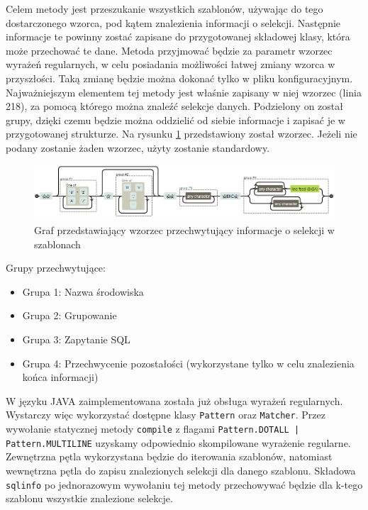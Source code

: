 Celem metody jest przeszukanie wszystkich szablonów, używając do tego dostarczonego wzorca, pod kątem znalezienia informacji o selekcji. Następnie informacje te powinny zostać zapisane do przygotowanej składowej klasy, która może przechować te dane. 
Metoda przyjmować będzie za parametr wzorzec wyrażeń regularnych, w celu posiadania możliwości łatwej zmiany wzorca w przyszłości. Taką zmianę będzie można dokonać tylko w pliku konfiguracyjnym. 
Najważniejszym elementem tej metody jest właśnie zapisany w niej wzorzec (linia 218), za pomocą którego można znaleźć selekcje danych. Podzielony on został grupy, dzięki czemu będzie można oddzielić od siebie informacje i zapisać je w przygotowanej strukturze. Na rysunku \ref{fig:Wzorzec} przedstawiony został wzorzec. Jeżeli nie podany zostanie żaden wzorzec, użyty zostanie standardowy. 
\begin{figure}[h]
    \centering
    
    \includegraphics[width=1\textwidth]{rys/implementacja/regex.png}
    \caption{Graf przedstawiający wzorzec przechwytujący informacje o selekcji w szablonach}
    \label{fig:Wzorzec}
\end{figure}
\par
Grupy przechwytujące:
\begin{itemize}
\item Grupa 1: Nazwa środowiska
\item Grupa 2: Grupowanie
\item Grupa 3: Zapytanie SQL
\item Grupa 4: Przechwycenie pozostałości (wykorzystane tylko w celu znalezienia końca informacji)
\end{itemize}
\vspace{5mm}
 \par
W języku JAVA zaimplementowana została już obsługa wyrażeń regularnych. Wystarczy więc wykorzystać dostępne klasy \texttt{Pattern} oraz \texttt{Matcher}. Przez wywołanie statycznej metody \texttt{compile} z flagami \texttt{Pattern.DOTALL | Pattern.MULTILINE} uzyskamy odpowiednio skompilowane wyrażenie regularne. Zewnętrzna pętla wykorzystana będzie do iterowania szablonów, natomiast wewnętrzna pętla do zapisu znalezionych selekcji dla danego szablonu. Składowa \texttt{sqlinfo} po jednorazowym wywołaniu tej metody przechowywać będzie dla k-tego szablonu wszystkie znalezione selekcje.

